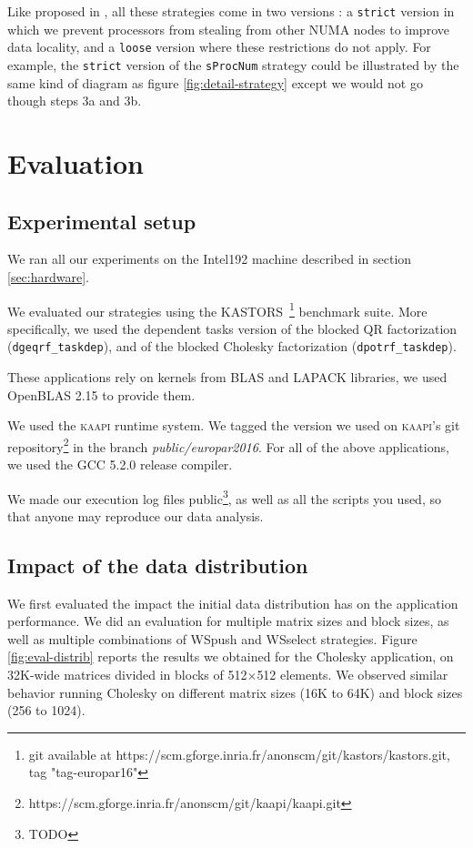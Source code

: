 \documentclass{Styles/llncs}
\newcommand{\kaapi}{\textsc{\mbox{kaapi}}\xspace}
\begin{document}
Like proposed in \cite{Olivier:2012:CMW:2388996.2389085}, all these strategies come in two versions : a \verb!strict! version in which we prevent processors from stealing from other NUMA nodes to improve data locality, and a \verb!loose! version where these restrictions do not apply.
For example, the \verb!strict! version of the \verb!sProcNum! strategy could be illustrated by the same kind of diagram as figure \ref{fig:detail-strategy} except we would not go though steps 3a and 3b.

\section{Evaluation}

\subsection{Experimental setup}

We ran all our experiments on the Intel192 machine described in section \ref{sec:hardware}.

We evaluated our strategies using the KASTORS~\cite{virouleau:hal-01081974}\footnote{git available at https://scm.gforge.inria.fr/anonscm/git/kastors/kastors.git, tag "tag-europar16"} benchmark suite.
More specifically, we used the dependent tasks version of the blocked QR factorization
(\verb/dgeqrf_taskdep/), and of the blocked Cholesky factorization (\verb/dpotrf_taskdep/).

These applications rely on kernels from BLAS and LAPACK libraries, we used OpenBLAS 2.15
to provide them.

We used the \kaapi runtime system. We tagged the version we used on \kaapi's
git repository\footnote{https://scm.gforge.inria.fr/anonscm/git/kaapi/kaapi.git } in the branch \emph{public/europar2016}.
For all of the above applications, we used the GCC 5.2.0 release compiler.

We made our execution log files public\footnote{TODO}, as well as all the scripts you used, so that
anyone may reproduce our data analysis.

\subsection{Impact of the data distribution}

We first evaluated the impact the initial data distribution has on the application performance. We did an evaluation for multiple matrix sizes and block sizes,
as well as multiple combinations of WSpush and WSselect strategies. Figure \ref{fig:eval-distrib} reports the
results we obtained for the Cholesky application, on 32K-wide matrices divided in blocks of 512$\times$512 elements. We observed similar behavior running Cholesky on different matrix sizes (16K to 64K) and block sizes (256 to 1024).
\end{document}
